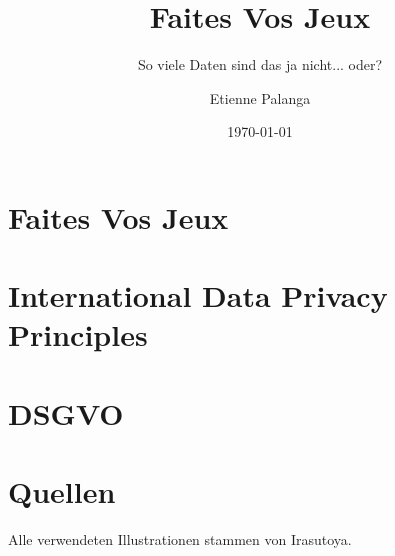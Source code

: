 \documentclass[11pt, a4paper]{scrartcl}
\title{Faites Vos Jeux}
\subtitle{So viele Daten sind das ja nicht... oder?}
\author{Etienne Palanga}
\date{\today}
\begin{document}
\maketitle

\tableofcontents




\section{Faites Vos Jeux}

\section{International Data Privacy Principles}

\section{DSGVO}

\newpage

\section{Quellen}

Alle verwendeten Illustrationen stammen von Irasutoya.\cite{mifune_irasutoya_nodate} 

\nocite{mifune_irasutoya_nodate}

\printbibliography[heading=none]
\end{document}
